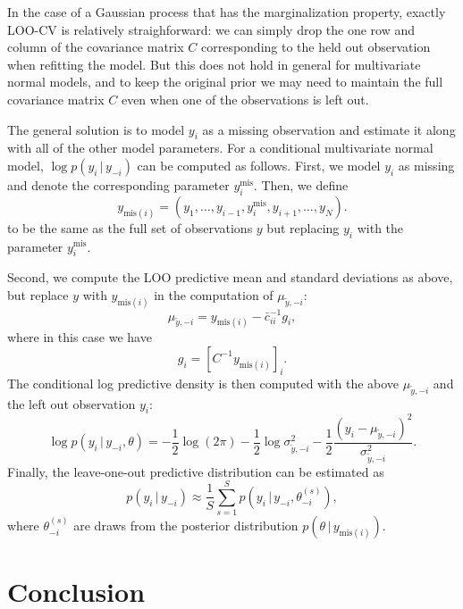 \documentclass[11pt]{article}
\begin{document}
In the case of a Gaussian process that has the
marginalization property, exactly LOO-CV is relatively straighforward: we can simply drop 
the one row and column of the covariance matrix $C$ corresponding to the held out observation
when refitting the model. But this does not hold in general for
multivariate normal models, and to keep the original prior we may need
to maintain the full covariance matrix $C$ even when one of the observations is
left out.

The general solution is to model $y_i$ as a missing observation and estimate it along
with all of the other model parameters. For a conditional multivariate normal
model, $\log p(y_i\,|\,y_{-i})$ can be computed as follows. First, we model
$y_i$ as missing and denote the corresponding parameter $y_i^{\mathrm{mis}}$.
Then, we define
%
\begin{equation}
y_{\mathrm{mis}(i)} = (y_1, \ldots, y_{i-1}, y_i^{\mathrm{mis}}, y_{i+1}, \ldots, y_N).
\end{equation}
%
to be the same as the full set of observations $y$ but replacing $y_i$ with
the parameter $y_i^{\mathrm{mis}}$.

Second, we compute the LOO predictive mean and standard deviations as above, but
replace $y$ with $y_{\mathrm{mis}(i)}$ in the computation of
$\mu_{\tilde{y},-i}$:
%
\begin{equation}
\mu_{\tilde{y},-i} = y_{{\mathrm{mis}}(i)}-\bar{c}_{ii}^{-1}g_i,
\end{equation}
%
where in this case we have
%
\begin{equation}
g_i = \left[ C^{-1} y_{\mathrm{mis}(i)} \right]_i.
\end{equation}
%
The conditional log predictive density is then computed with the above
$\mu_{\tilde{y},-i}$ and the left out observation $y_i$:
%
\begin{equation}
  \log p(y_i\,|\,y_{-i},\theta)
  = - \frac{1}{2}\log(2\pi)
  - \frac{1}{2}\log \sigma^2_{\tilde{y},-i}
  - \frac{1}{2}\frac{(y_i-\mu_{\tilde{y},-i})^2}{\sigma^2_{\tilde{y},-i}}.
\end{equation}
%
Finally, the leave-one-out predictive distribution can be estimated as
%
\begin{equation}
 p(y_i\,|\,y_{-i}) \approx \frac{1}{S} \sum_{s=1}^S p(y_i\,|\,y_{-i}, \theta_{-i}^{(s)}),
\end{equation}
%
where $\theta_{-i}^{(s)}$ are draws from the posterior distribution
$p(\theta\,|\,y_{\mathrm{mis}(i)})$.

\section{Conclusion}
\end{document}
